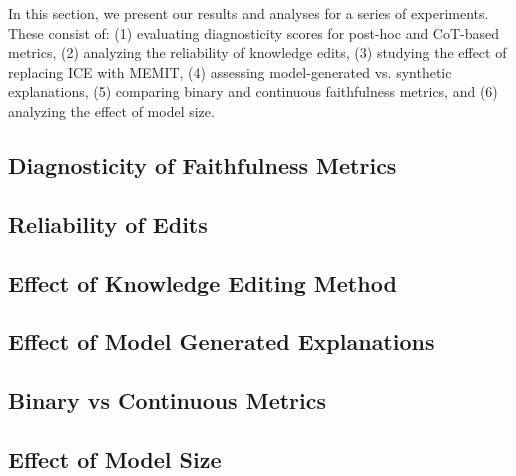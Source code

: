 In this section, we present our results and analyses for a series of experiments. These consist of: (1) evaluating diagnosticity scores for post-hoc and CoT-based metrics, (2) analyzing the reliability of knowledge edits, (3) studying the effect of replacing ICE with MEMIT, (4) assessing model-generated vs. synthetic explanations, (5) comparing binary and continuous faithfulness metrics, and (6) analyzing the effect of model size.




\subsection{Diagnosticity of Faithfulness Metrics}

\subsection{Reliability of Edits}
\label{subsec:edit_reliability}


\subsection{Effect of Knowledge Editing Method}




\subsection{Effect of Model Generated Explanations}




\subsection{Binary vs Continuous Metrics}


\subsection{Effect of Model Size}
